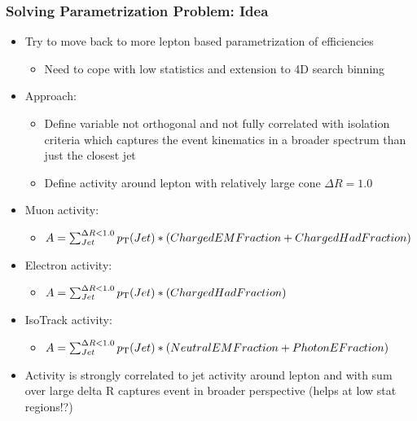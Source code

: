 \documentclass{beamer}
\begin{document}
\begin{frame}
 \frametitle{Solving Parametrization Problem: Idea}
 \begin{itemize}
  \item Try to move back to more lepton based parametrization of efficiencies
  \begin{itemize}
   \item Need to cope with low statistics and extension to 4D search binning
  \end{itemize}
  \item Approach:
  \begin{itemize}
   \item Define variable not orthogonal and not fully correlated with isolation criteria which captures the event kinematics in a broader spectrum than just the closest jet
   \item Define activity around lepton with relatively large cone $\Delta R=1.0$
  \end{itemize}
  \item Muon activity:
  \begin{itemize}
   \item $A = \sum_{Jet}^{\Delta R<1.0} p_{\text{T}}(Jet) * (ChargedEMFraction + ChargedHadFraction) $ 
  \end{itemize}
    \item Electron activity:
  \begin{itemize}
   \item $A = \sum_{Jet}^{\Delta R<1.0} p_{\text{T}}(Jet) * (ChargedHadFraction) $ 
  \end{itemize}
      \item IsoTrack activity:
  \begin{itemize}
   \item $A = \sum_{Jet}^{\Delta R<1.0} p_{\text{T}}(Jet) * (NeutralEMFraction + PhotonEFraction) $ 
  \end{itemize}
  \item Activity is strongly correlated to jet activity around lepton and with sum over large delta R captures event in broader perspective (helps at low stat regions!?)
 \end{itemize}
\end{frame}
\end{document}
